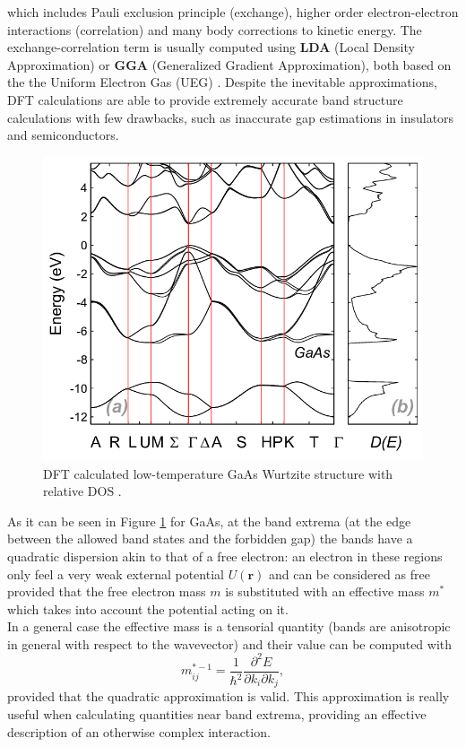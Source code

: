 \documentclass[12pt, a4paper]{report}
\numberwithin{equation}{section}
\begin{document}
which includes Pauli exclusion principle (exchange), higher order electron-electron interactions (correlation) and many body corrections to kinetic energy. The exchange-correlation 
term is usually computed using \textbf{LDA} (Local Density Approximation) or \textbf{GGA} (Generalized Gradient Approximation), both based on the the Uniform Electron 
Gas (UEG) \cite{ziesche1998density}.
Despite the inevitable approximations, DFT calculations are able to provide extremely accurate band structure calculations 
with few drawbacks, such as inaccurate gap estimations in insulators and semiconductors.
\begin{figure}[H]
    \centering
    \includegraphics[scale=0.4]{a-Calculated-low-temperature-band-structure-for-GaAs-in-WZ-phase-b-Calculated-DOS.png}
    \caption{DFT calculated low-temperature GaAs Wurtzite structure with relative DOS \cite{GaAs_wurtzite_structure}.}
    \label{fig:GaAs_Wurtzite_structure}
\end{figure}
As it can be seen in Figure \ref{fig:GaAs_Wurtzite_structure} for GaAs, at the band extrema (at the edge between the allowed band states 
and the forbidden gap) the bands have a quadratic dispersion akin to that of a free electron: an electron in these regions only feel a 
very weak external potential $U(\mathbf{r})$ and can be considered as free provided that the free electron mass $m$ is substituted with an effective mass 
$m^*$ which takes into account the potential acting on it.\\
In a general case the effective mass is a tensorial quantity (bands are anisotropic in general with respect to the wavevector) and 
their value can be computed with
\begin{equation}
    m^{*-1}_{ij}=\frac{1}{\hbar^2}\frac{\partial^2 E}{\partial k_i \partial k_j},
    \label{eq_effective_mass}
\end{equation}
provided that the quadratic approximation is valid. This approximation is really useful when calculating quantities near band extrema, 
providing an effective description of an otherwise complex interaction.
\end{document}
